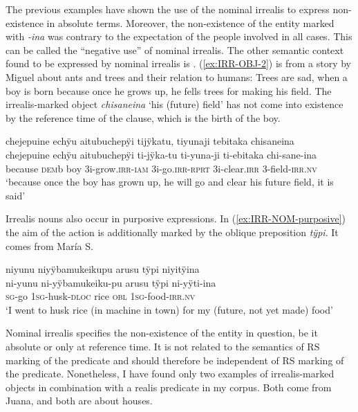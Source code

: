 The previous examples have shown the use of the nominal irrealis to express non-existence in absolute terms. Moreover, the non-existence of the entity marked with \textit{-ina} was contrary to the expectation of the people involved in all cases. This can be called the “negative use” of nominal irrealis. The other semantic context found to be expressed by nominal irrealis is . (\ref{ex:IRR-OBJ-2}) is from a story by Miguel about ants and trees and their relation to humans: Trees are sad, when a boy is born because once he grows up, he fells trees for making his field. The irrealis-marked object \textit{chisaneina} ‘his (future) field’ has not come into existence by the reference time of the clause, which is the birth of the boy.

\ea\label{ex:IRR-OBJ-2}
\begingl 
\glpreamble chejepuine echÿu aitubuchepÿi tijÿkatu, tiyunaji tebitaka chisaneina\\
\gla chejepuine echÿu aitubuchepÿi ti-jÿka-tu ti-yuna-ji ti-ebitaka chi-sane-ina\\ 
\glb because \textsc{dem}b boy 3i-grow.\textsc{irr}-\textsc{iam} 3i-go.\textsc{irr}-\textsc{rprt} 3i-clear.\textsc{irr} 3-field-\textsc{irr.nv}\\ 
\glft ‘because once the boy has grown up, he will go and clear his future field, it is said’\\ 
\endgl
{}
\xe

Irrealis nouns also occur in purposive expressions. In (\ref{ex:IRR-NOM-purposive}) the aim of the action is additionally marked by the oblique preposition \textit{tÿpi}. It comes from María S. 

\ea\label{ex:IRR-NOM-purposive}
\begingl 
\glpreamble niyunu niyÿbamukeikupu arusu tÿpi niyitÿina\\
\gla ni-yunu ni-yÿbamukeiku-pu arusu tÿpi ni-yÿti-ina\\ 
\textsc{sg}-go 1\textsc{sg}-husk-\textsc{dloc} rice \textsc{obl} 1\textsc{sg}-food-\textsc{irr.nv}\\ 
\glft ‘I went to husk rice (in machine in town) for my (future, not yet made) food’\\ 
\endgl
\trailingcitation{[rxx-e120511l.024-025]}
\xe

Nominal irrealis specifies the non-existence of the entity in question, be it absolute or only at reference time. It is not related to the semantics of RS marking of the predicate and should therefore be independent of RS marking of the predicate. Nonetheless, I have found only two examples of irrealis-marked objects in combination with a realis predicate in my corpus. Both come from Juana, and both are about houses.

